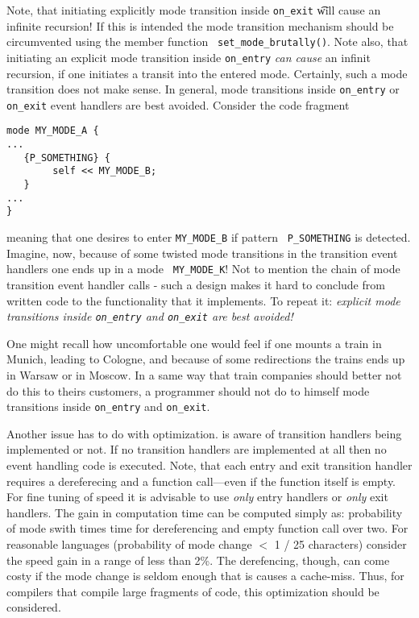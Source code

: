 Note, that initiating explicitly mode transition inside {\tt on\_exit} {\t
  will cause} an infinite recursion! If this is intended the mode transition
mechanism should be circumvented using the member function {\tt
  set\_mode\_\-brutally()}.  Note also, that initiating an explicit mode
transition inside {\tt on\_entry} {\it can cause} an infinit recursion, if one
initiates a  transit into the entered mode. Certainly, such a mode
transition does not make sense.
In general, mode transitions inside {\tt on\_entry} or {\tt on\_exit}
event handlers are best avoided. Consider the code fragment 
\begin{lstlisting}
mode MY_MODE_A {
...
   {P_SOMETHING} {
        self << MY_MODE_B;
   }
...
}
\end{lstlisting}
meaning that one desires to enter {\tt MY\_MODE\_B} if pattern {\tt
  P\_SOMETHING} is detected. Imagine, now, because of some twisted mode
transitions in the transition event handlers one ends up in a mode {\tt
  MY\_MODE\_K}! Not to mention the chain of mode transition event
handler calls - such a design makes it hard to conclude from written code to
the functionality that it implements. To repeat it: {\it explicit mode
  transitions inside {\tt on\_entry} and {\tt on\_exit} are best avoided!}

One might recall how uncomfortable one would feel if one mounts a train in
Munich, leading to Cologne, and because of some redirections the trains ends
up in Warsaw or in Moscow. In a same way that train companies should better
not do this to theirs customers, a programmer should not do to himself mode
transitions inside {\tt on\_entry} and {\tt on\_exit}.

Another issue has to do with optimization. {\Quex} is aware of transition handlers
being implemented or not. If no transition handlers are implemented at all then
no event handling code is executed. Note, that each entry and exit transition
handler requires a dereferecing and a function call---even if the function itself
is empty. For fine tuning of speed it is advisable to use {\it only} entry handlers
or {\it only} exit handlers. The gain in computation time can be computed simply
as: probability of mode swith times time for dereferencing and empty function call
over two. For reasonable languages (probability of mode change $<$ 1 / 25 characters) 
consider the speed gain in a range of less than 2\%. The derefencing, though, can
come costy if the mode change is seldom enough that is causes a cache-miss. Thus,
for compilers that compile large fragments of code, this optimization should be
considered.

